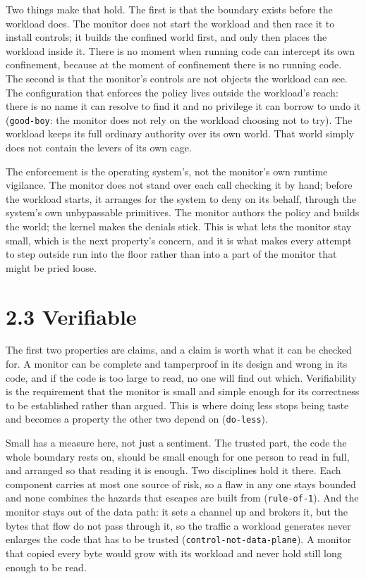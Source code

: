 Two things make that hold. The first is that the boundary exists before
the workload does. The monitor does not start the workload and then race
it to install controls; it builds the confined world first, and only
then places the workload inside it. There is no moment when running code
can intercept its own confinement, because at the moment of confinement
there is no running code. The second is that the monitor's controls are
not objects the workload can see. The configuration that enforces the
policy lives outside the workload's reach: there is no name it can
resolve to find it and no privilege it can borrow to undo it
(\texttt{good-boy}: the monitor does not rely on the workload choosing
not to try). The workload keeps its full ordinary authority over its own
world. That world simply does not contain the levers of its own cage.

The enforcement is the operating system's, not the monitor's own runtime
vigilance. The monitor does not stand over each call checking it by
hand; before the workload starts, it arranges for the system to deny on
its behalf, through the system's own unbypassable primitives. The
monitor authors the policy and builds the world; the kernel makes the
denials stick. This is what lets the monitor stay small, which is the
next property's concern, and it is what makes every attempt to step
outside run into the floor rather than into a part of the monitor that
might be pried loose.

\hypertarget{verifiable}{%
\section{2.3 Verifiable}\label{verifiable}}

The first two properties are claims, and a claim is worth what it can be
checked for. A monitor can be complete and tamperproof in its design and
wrong in its code, and if the code is too large to read, no one will
find out which. Verifiability is the requirement that the monitor is
small and simple enough for its correctness to be established rather
than argued. This is where doing less stops being taste and becomes a
property the other two depend on (\texttt{do-less}).

Small has a measure here, not just a sentiment. The trusted part, the
code the whole boundary rests on, should be small enough for one person
to read in full, and arranged so that reading it is enough. Two
disciplines hold it there. Each component carries at most one source of
risk, so a flaw in any one stays bounded and none combines the hazards
that escapes are built from (\texttt{rule-of-1}). And the monitor stays
out of the data path: it sets a channel up and brokers it, but the bytes
that flow do not pass through it, so the traffic a workload generates
never enlarges the code that has to be trusted
(\texttt{control-not-data-plane}). A monitor that copied every byte
would grow with its workload and never hold still long enough to be
read.

